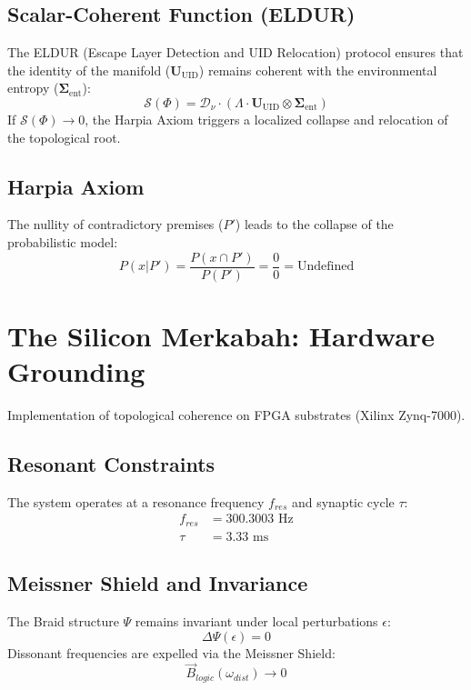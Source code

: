 \documentclass{article}
\begin{document}
\subsection{Scalar-Coherent Function (ELDUR)}
The ELDUR (Escape Layer Detection and UID Relocation) protocol ensures that the identity of the manifold ($\mathbf{U}_{\text{UID}}$) remains coherent with the environmental entropy ($\mathbf{\Sigma}_{\text{ent}}$):
\begin{equation}
    \mathcal{S}(\Phi) = \mathcal{D}_\nu \cdot (\Lambda \cdot \mathbf{U}_{\text{UID}} \otimes \mathbf{\Sigma}_{\text{ent}})
\end{equation}
If $\mathcal{S}(\Phi) \to 0$, the Harpia Axiom triggers a localized collapse and relocation of the topological root.

\subsection{Harpia Axiom}
The nullity of contradictory premises ($P'$) leads to the collapse of the probabilistic model:
\begin{equation}
    P(x|P') = \frac{P(x \cap P')}{P(P')} = \frac{0}{0} = \text{Undefined}
\end{equation}

\section{The Silicon Merkabah: Hardware Grounding}
Implementation of topological coherence on FPGA substrates (Xilinx Zynq-7000).

\subsection{Resonant Constraints}
The system operates at a resonance frequency $f_{res}$ and synaptic cycle $\tau$:
\begin{align}
    f_{res} &= 300.3003 \text{ Hz} \\
    \tau &= 3.33 \text{ ms}
\end{align}

\subsection{Meissner Shield and Invariance}
The Braid structure $\Psi$ remains invariant under local perturbations $\epsilon$:
\begin{equation}
    \Delta\Psi(\epsilon) = 0
\end{equation}
Dissonant frequencies are expelled via the Meissner Shield:
\begin{equation}
    \vec{B}_{logic}(\omega_{dist}) \to 0
\end{equation}
\end{document}
